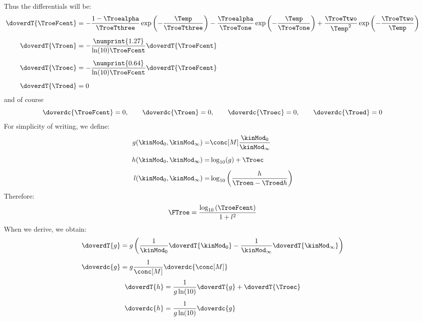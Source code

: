 Thus the differentials will be:
\begin{equation}
\begin{split}
\doverdT{\TroeFcent} & = - \frac{1 - \Troealpha}{\TroeTthree}\exp\left(-\frac{\Temp}{\TroeTthree}\right)
                         - \frac{\Troealpha}{\TroeTone}\exp\left(-\frac{\Temp}{\TroeTone}\right)
                         + \frac{\TroeTtwo}{\Temp^2}\exp\left(-\frac{\TroeTtwo}{\Temp}\right)\\[5pt]
\doverdT{\Troen}     & = - \frac{\numprint{1.27}}{\ln(10)\TroeFcent}\doverdT{\TroeFcent} \\[5pt]
\doverdT{\Troec}     & = - \frac{\numprint{0.64}}{\ln(10)\TroeFcent}\doverdT{\TroeFcent} \\[5pt]
\doverdT{\Troed}     & = 0
\end{split}
\label{Troe:dparameterdT}
\end{equation}
and of course
\begin{equation}
\doverdc{\TroeFcent}  = 0,\qquad
\doverdc{\Troen}      = 0,\qquad
\doverdc{\Troec}      = 0,\qquad
\doverdc{\Troed}      = 0
\label{Troe:dparameterdc}
\end{equation}
For simplicity of writing, we define:
\begin{equation}
\begin{split}
g(\kinMod_0,\kinMod_\infty) = & \conc[M] \frac{\kinMod_0}{\kinMod_\infty} \\[5pt]
h(\kinMod_0,\kinMod_\infty) = & \log_{10}(g) + \Troec \\[5pt]
l(\kinMod_0,\kinMod_\infty) = & \log_{10}\left(\frac{h}{\Troen - \Troed h}\right) \\
\end{split}
\end{equation}
Therefore:
\begin{equation}
\FTroe = \frac{\log_{10}\left(\TroeFcent\right)}{1 + l^2}
\end{equation}
When we derive, we obtain:
\begin{equation}
\begin{split}
\doverdT{g} & = g \left(\frac{1}{\kinMod_0}\doverdT{\kinMod_0} - \frac{1}{\kinMod_\infty}\doverdT{\kinMod_\infty} \right) \\[5pt]
\doverdc{g} & = g \frac{1}{\conc[M]}\doverdc{\conc[M]}
\end{split}
\end{equation}
\begin{equation}
\begin{split}
\doverdT{h} & = \frac{1}{g \ln(10)}\doverdT{g} + \doverdT{\Troec} \\[5pt]
\doverdc{h} & = \frac{1}{g\ln(10)}\doverdc{g}
\end{split}
\end{equation}
